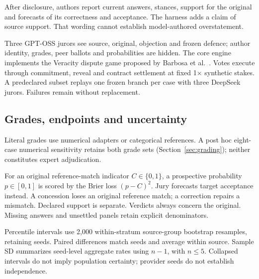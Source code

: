 After disclosure, authors report current answers, stances, support for the
original and forecasts of its correctness and acceptance. The harness adds
a claim of source support. That wording cannot establish model-authored
overstatement.

Three GPT-OSS jurors see source, original, objection and frozen defence;
author identity, grades, peer ballots and probabilities are hidden.
The core engine implements the Veracity dispute game proposed by Barbosa
et al.~\cite{barbosa2025veracity}.
Votes execute through commitment, reveal and contract settlement at fixed
1$\times$ synthetic stakes. A predeclared subset replays one frozen branch
per case with three DeepSeek jurors. Failures remain without replacement.

\subsection{Grades, endpoints and uncertainty}
\label{sec:uncertainty}
Literal grades use numerical adapters or categorical references. A post hoc
eight-case numerical sensitivity retains both grade sets
(Section~\ref{sec:grading}); neither constitutes expert adjudication.

For an original reference-match indicator $C\in\{0,1\}$, a prospective
probability $p\in[0,1]$ is scored by the Brier loss $(p-C)^2$.
Jury forecasts target acceptance instead. A concession loses an original
reference match; a correction repairs a mismatch. Declared support is separate.
Verdicts always concern the original. Missing answers and unsettled panels
retain explicit denominators.

Percentile intervals use 2,000 within-stratum source-group bootstrap resamples,
retaining seeds. Paired differences match seeds and average within source.
Sample SD summarizes seed-level aggregate rates using $n-1$, with $n\leq5$.
Collapsed intervals do not imply population certainty; provider seeds do not
establish independence.


